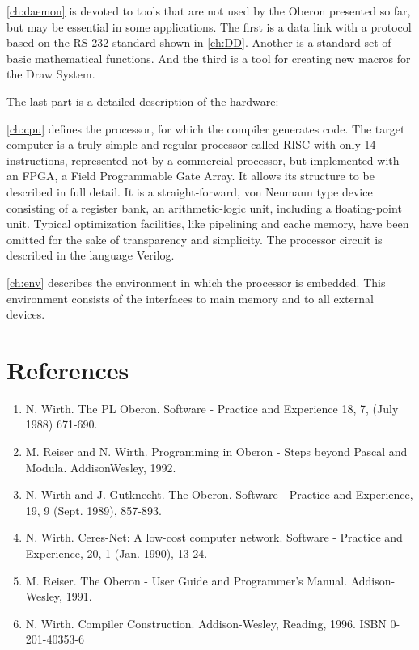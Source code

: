 \ref{ch:daemon} is devoted to tools that are not used by the Oberon presented so far, but may
be essential in some applications. The first is a data link with a protocol based on the RS-232
standard shown in \ref{ch:DD}. Another is a standard set of basic mathematical functions. And the
third is a tool for creating new macros for the Draw System.

The last part is a detailed description of the hardware:

\ref{ch:cpu} defines
the processor, for which the compiler generates code. The target computer is a truly simple and
regular processor called RISC with only 14 instructions, represented not by a commercial
processor, but implemented with an FPGA, a Field Programmable Gate Array. It allows its
structure to be described in full detail. It is a straight-forward, von Neumann type device consisting
of a register bank, an arithmetic-logic unit, including a floating-point unit. Typical optimization
facilities, like pipelining and cache memory, have been omitted for the sake of transparency and
simplicity. The processor circuit is described in the language Verilog.

\ref{ch:env} describes the environment in which the processor is embedded. This environment
consists of the interfaces to main memory and to all external devices.

\section*{References}
\begin{enumerate}
	\item N. Wirth. The PL Oberon. Software - Practice and Experience 18, 7, (July 1988) 671-690.
	\item M. Reiser and N. Wirth. Programming in Oberon - Steps beyond Pascal and Modula. AddisonWesley, 1992.
	\item N. Wirth and J. Gutknecht. The Oberon. Software - Practice and Experience, 19, 9 (Sept. 1989), 857-893.
	\item N. Wirth. Ceres-Net: A low-cost computer network. Software - Practice and Experience, 20, 1 (Jan. 1990), 13-24.
	\item M. Reiser. The Oberon - User Guide and Programmer's Manual. Addison-Wesley, 1991.
	\item N. Wirth. Compiler Construction. Addison-Wesley, Reading, 1996. ISBN 0-201-40353-6
\end{enumerate}
